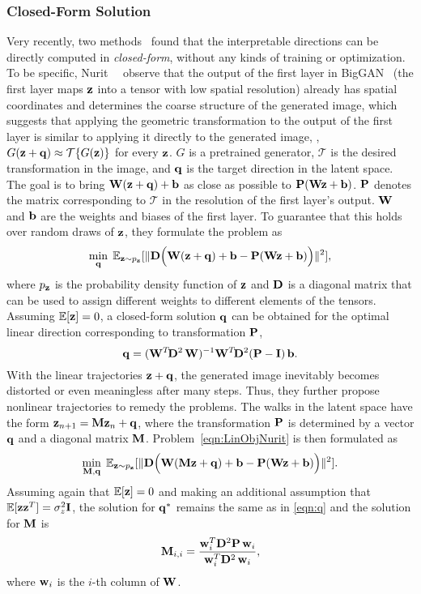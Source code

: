 \subsubsection{Closed-Form Solution}
\label{sec:closed}
Very recently, two methods~\cite{nurit2020steerability,shen2020closedform} found that the interpretable directions can be directly computed in \textit{closed-form}, without any kinds of training or optimization. 
To be specific, Nurit~\etal~\cite{nurit2020steerability} observe that the output of the first layer in BigGAN~\cite{brock2018large} (the first layer maps $\mathbf{z}$ into a tensor with low spatial resolution) already has spatial coordinates and determines the coarse structure of the generated image, which suggests that applying the geometric transformation to the output of the first layer is similar to applying it directly to the generated image, \ie, $G(\mathbf{z}+\mathbf{q})\approx \mathcal{T}\{G(\mathbf{z})\}$ for every $\mathbf{z}$. 
$G$ is a pretrained generator, $\mathcal{T}$ is the desired transformation in the image, and $\mathbf{q}$ is the target direction in the latent space.
The goal is to bring $\mathbf{W}(\mathbf{z}+\mathbf{q})+\mathbf{b}$ as close as possible to $\mathbf{P}(\mathbf{W}\mathbf{z}+\mathbf{b})$.
$\mathbf{P}$ denotes the matrix corresponding to $\mathcal{T}$ in the resolution of the first layer's output. 
$\mathbf{W}$ and $\mathbf{b}$ are the weights and biases of the first layer.
To guarantee that this holds over random draws of $\mathbf{z}$, they formulate the problem as
\begin{equation}
\min_{\q}\;
\E_{\z \sim p_{\z}}
[\|\D\Big(\W(\z+\q)+\bb-\PP(\W\z+\bb)\Big)\|^2],
\label{eqn:LinObjNurit}
\end{equation}
where $p_{\mathbf{z}}$ is the probability density function of $\mathbf{z}$ and $\mathbf{D}$ is a diagonal matrix that can be used to assign different weights to different elements of the tensors. 
Assuming $\mathbb{E}[\mathbf{z}]=0$, a closed-form solution $\mathbf{q}$ can be obtained for the optimal linear direction corresponding to transformation $\mathbf{P}$,
\begin{equation}
\q = (\W^T\!\D^2\,\W)^{-1}\W^T\!\D^2(\PP-\I)\,\bb.
\label{eqn:q}
\end{equation}
With the linear trajectories $\mathbf{z}+\mathbf{q}$, the generated image inevitably becomes distorted or even meaningless after many steps.
Thus, they further propose nonlinear trajectories to remedy the problems. 
The walks in the latent space have the form $\mathbf{z}_{n+1}=\mathbf{M}\mathbf{z}_{n}+\mathbf{q}$, where the transformation $\mathbf{P}$ is determined by a vector $\mathbf{q}$ and a diagonal matrix $\mathbf{M}$.
Problem~\eqref{eqn:LinObjNurit} is then formulated as
\begin{equation}
\min_{\M,\q}\;\E_{\z \sim p_{\z}}[\|\D\Big(\W(\M\z+\q)+\bb-\PP(\W\z+\bb)\Big)\|^2].
\label{eq:LinNonObjNurit}
\end{equation}
Assuming again that $\mathbb{E}[\mathbf{z}]=0$ and making an additional assumption that $\mathbb{E}[\mathbf{z}\mathbf{z}^T]=\sigma^2_z \mathbf{I}$, the solution for $\mathbf{q}^*$ remains the same as in \eqref{eqn:q} and the solution for $\mathbf{M}$ is
\begin{equation}
\M_{i,i} = \frac{\w_i^T\D^2\PP\,\w_i}{\w_i^T\D^2\,\w_i},
\label{eqn:M}
\end{equation}
where $\mathbf{w}_i$ is the $i$-th column of $\mathbf{W}$.

